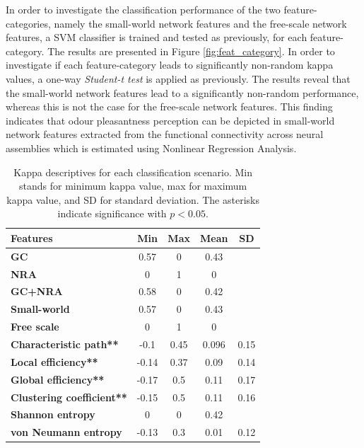In order to investigate the classification performance of the two feature-categories, namely the small-world network features and the free-scale network features, a SVM classifier is trained and tested as previously, for each feature-category. The results are presented in Figure \ref{fig:feat_category}. In order to investigate if each feature-category leads to significantly non-random kappa values, a one-way \emph{Student-t test} is applied as previously. The results reveal that the small-world network features lead to a significantly non-random performance, whereas this is not the case for the free-scale network features. This finding indicates that odour pleasantness perception can be depicted in small-world network features extracted from the functional connectivity across neural assemblies which is estimated using Nonlinear Regression Analysis. 

\begin{table}[ht]
\caption{Kappa descriptives for each classification scenario. Min stands for minimum kappa value, max for maximum kappa value, and SD for standard deviation. The asterisks indicate significance with $p<0.05$.}\label{Table1}
\centering %
{\begin{tabular}{|l|c|c|c|c|}
\hline
\toprule
 \textbf{Features} & \textbf{Min} & \textbf{Max} & \textbf{Mean} & \textbf{SD}\\
\hline
\toprule
\textbf{GC} & 0.57 & 0 & 0.43 & \\
\hline
\toprule
 \textbf{NRA} & 0 & 1 & 0 & \\
\hline
\toprule
\textbf{GC+NRA} & 0.58 & 0 & 0.42 & \\
\hline
\toprule
\textbf{Small-world} & 0.57 & 0 & 0.43 & \\
\hline
\toprule
 \textbf{Free scale} & 0 & 1 & 0 & \\
\hline
\toprule
\textbf{Characteristic path**} & -0.1 & 0.45 & 0.096 & 0.15\\
\hline
\toprule
\textbf{Local efficiency**} & -0.14 & 0.37 & 0.09 & 0.14\\
\hline
\toprule
\textbf{Global efficiency**} & -0.17 & 0.5 & 0.11 & 0.17\\
\hline
\toprule
 \textbf{Clustering coefficient**} & -0.15 & 0.5 & 0.11 & 0.16\\
\hline
\toprule
\textbf{Shannon entropy} & 0 & 0 & 0.42 & \\
\hline
\toprule
\textbf{von Neumann entropy} & -0.13 & 0.3 & 0.01 & 0.12\\
\bottomrule
\end{tabular}}
\end{table}


